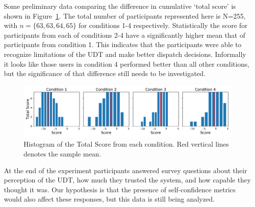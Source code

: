 Some preliminary data comparing the difference in cumulative `total score' is shown in Figure~\ref{fig:total_score}. The total number of participants represented here is N=255, with $n=\{63,63,64,65\}$ for conditions 1-4 respectively. Statistically the score for participants from each of conditions 2-4 have a significantly higher mean that of participants from condition 1. This indicates that the participants were able to recognize limitations of the UDT and make better dispatch decisions. Informally it looks like those users in condition 4 performed better than all other conditions, but the significance of that difference still needs to be investigated.

\begin{figure}[tbp]
    \centering
    \includegraphics[width=1.0\linewidth]{Figures/total_score.pdf}
    \caption{Histogram of the Total Score from each condition. Red vertical lines denotes the sample mean. }
    \label{fig:total_score}
\end{figure}

At the end of the experiment participants answered survey questions about their perception of the UDT, how much they trusted the system, and how capable they thought it was. Our hypothesis is that the presence of self-confidence metrics would also affect these responses, but this data is still being analyzed.

%
